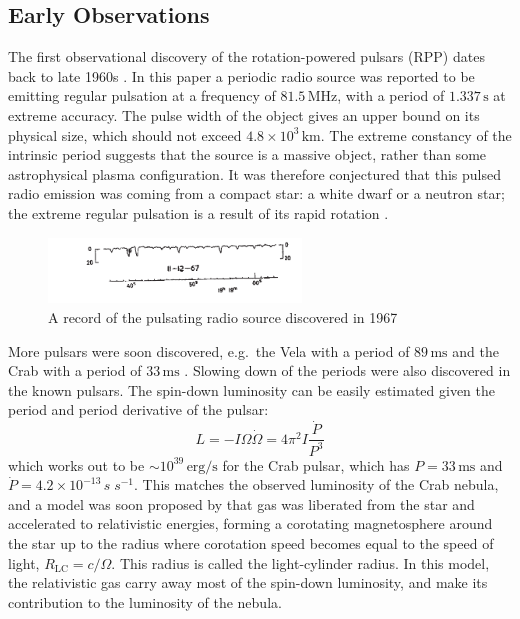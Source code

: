 \subsection{Early Observations}

The first observational discovery of the rotation-powered pulsars (RPP) dates
back to late 1960s \citep{hewish_observation_1968}. In this paper a periodic
radio source was reported to be emitting regular pulsation at a frequency of
$81.5\,\mathrm{MHz}$, with a period of $1.337\,\mathrm{s}$ at extreme accuracy.
The pulse width of the object gives an upper bound on its physical size, which
should not exceed $4.8\times 10^3\,\mathrm{km}$. The extreme constancy of the
intrinsic period suggests that the source is a massive object, rather than some
astrophysical plasma configuration. It was therefore conjectured that this
pulsed radio emission was coming from a compact star: a white dwarf or a neutron
star; the extreme regular pulsation is a result of its rapid rotation
\citep{gold_rotating_1968}.

\begin{figure}[h]
  \centering
  \includegraphics[width=0.6\textwidth]{pics/intro/pulses.png}
  \caption{A record of the pulsating radio source discovered in 1967
    \citep{hewish_observation_1968}}
  \label{fig:pulse}
\end{figure}

More pulsars were soon discovered, e.g.\ the Vela with a period of
$89\,\mathrm{ms}$ \citep{large_pulsar_1968} and the Crab with a period of
$33\,\mathrm{ms}$ \citep{lovelace_pulsar_1968}. Slowing down of the periods were
also discovered in the known pulsars. The spin-down luminosity can be easily
estimated given the period and period derivative of the pulsar:
\begin{equation}
  \label{eq:spindown-power}
  L = -I\Omega\dot{\Omega} = 4\pi^2 I\frac{\dot{P}}{P^3}
\end{equation}
which works out to be $\sim 10^{39}\,\mathrm{erg/s}$ for the Crab pulsar, which
has $P = 33\,\mathrm{ms}$ and $\dot{P} = 4.2\times 10^{-13}\,{s\;s^{-1}}$. This
matches the observed luminosity of the Crab nebula, and a model was soon
proposed by \citet{gold_rotating_1969} that gas was liberated from the star and
accelerated to relativistic energies, forming a corotating magnetosphere around
the star up to the radius where corotation speed becomes equal to the speed of
light, $R_\mathrm{LC} = c/\Omega$. This radius is called the light-cylinder
radius. In this model, the relativistic gas carry away most of the spin-down
luminosity, and make its contribution to the luminosity of the nebula.

